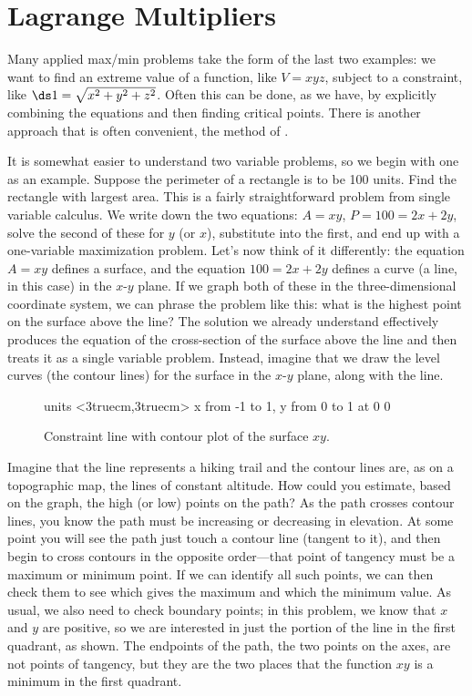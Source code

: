 \section{Lagrange Multipliers}\label{sec:LagrangeMultipliers}

Many applied max/min problems take the form of the last two examples:
we want to find an extreme value of a function, like $V=xyz$, subject
to a constraint, like $\ds1=\sqrt{x^2+y^2+z^2}$. Often this can be
done, as we have, by explicitly combining the equations and then
finding critical points. There is another approach that is often
convenient, the method of .

It is somewhat easier to understand two variable problems, so we begin
with one as an example. Suppose the perimeter of a rectangle is to be
100 units. Find the rectangle with largest area. This is a fairly
straightforward problem from single variable calculus. We write down
the two equations: $A=xy$, $P=100=2x+2y$, solve the second of these
for $y$ (or $x$), substitute into the first, and end up with a
one-variable maximization problem. Let's now think of it differently:
the equation $A=xy$ defines a surface, and the equation $100=2x+2y$
defines a curve (a line, in this case) in the $x$-$y$ plane. If we
graph both of these in the three-dimensional coordinate system, we can
phrase the problem like this: what is the highest point on the surface
above the line? The solution we already understand effectively
produces the equation of the cross-section of the surface above the
line and then treats it as a single variable problem. Instead, imagine
that we draw the level curves (the contour lines) for the surface in
the $x$-$y$ plane, along with the line.

\begin{figure}[H]
\centerline{
\vbox{\beginpicture
\normalgraphs
\setcoordinatesystem units <3truecm,3truecm>
\setplotarea x from -1 to 1, y from 0 to 1
 at 0 0
\endpicture}}
\caption{Constraint line with contour plot of the surface $xy$.}
\label{fig:lagrange}
\end{figure}

Imagine that the line represents a hiking trail and the contour lines
are, as on a topographic map, the lines of constant altitude. How
could you estimate, based on the graph, the high (or low) points on
the path? As the path crosses contour lines, you know the path must be
increasing or decreasing in elevation. At some point you will see the
path just touch a contour line (tangent to it), and then begin to
cross contours in the opposite order---that point of tangency must be
a maximum or minimum point. If we can identify all such points, we can
then check them to see which gives the maximum and which the minimum
value. As usual, we also need to check boundary points; in this
problem, we know that $x$ and $y$ are positive, so we are interested
in just the portion of the line in the first quadrant, as shown. The
endpoints of the path, the two points on the axes, are not points of
tangency, but they are the two places that the function $xy$ is a
minimum in the first quadrant.


